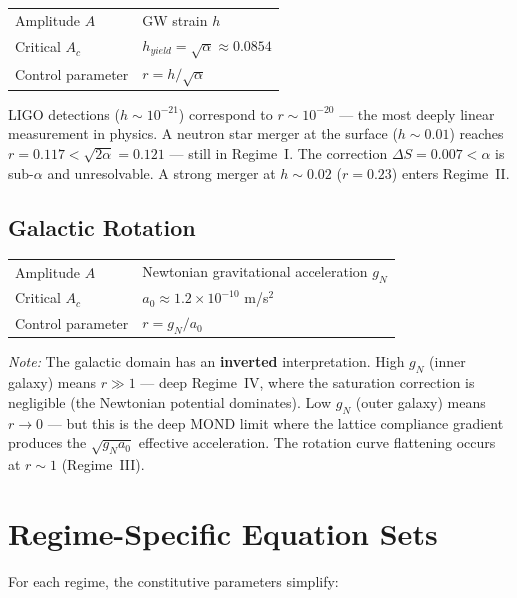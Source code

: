 \begin{center}
\begin{tabular}{ll}
\toprule
Amplitude $A$ & GW strain $h$ \\
Critical $A_c$ & $h_{yield} = \sqrt{\alpha} \approx 0.0854$ \\
Control parameter & $r = h / \sqrt{\alpha}$ \\
\bottomrule
\end{tabular}
\end{center}

\noindent LIGO detections ($h \sim 10^{-21}$) correspond to $r \sim 10^{-20}$ --- the most deeply linear measurement in physics. A neutron star merger at the surface ($h \sim 0.01$) reaches $r = 0.117 < \sqrt{2\alpha} = 0.121$ --- still in Regime~I. The correction $\Delta S = 0.007 < \alpha$ is sub-$\alpha$ and unresolvable. A strong merger at $h \sim 0.02$ ($r = 0.23$) enters Regime~II.

\subsection{Galactic Rotation}

\begin{center}
\begin{tabular}{ll}
\toprule
Amplitude $A$ & Newtonian gravitational acceleration $g_N$ \\
Critical $A_c$ & $a_0 \approx 1.2 \times 10^{-10}$ m/s$^2$ \\
Control parameter & $r = g_N / a_0$ \\
\bottomrule
\end{tabular}
\end{center}

\noindent \textit{Note:} The galactic domain has an \textbf{inverted} interpretation. High $g_N$ (inner galaxy) means $r \gg 1$ --- deep Regime~IV, where the saturation correction is negligible (the Newtonian potential dominates). Low $g_N$ (outer galaxy) means $r \to 0$ --- but this is the deep MOND limit where the lattice compliance gradient produces the $\sqrt{g_N a_0}$ effective acceleration. The rotation curve flattening occurs at $r \sim 1$ (Regime~III).

\section{Regime-Specific Equation Sets}

For each regime, the constitutive parameters simplify:

